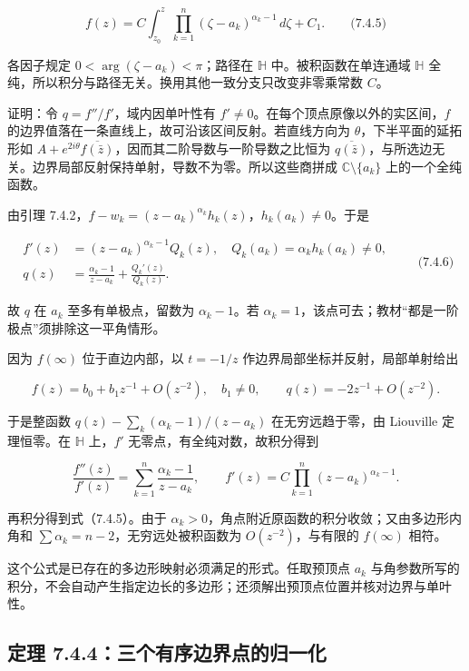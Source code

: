 \documentclass[11pt,a4paper]{article}
\begin{document}
\[
f(z)=C\int_{z_0}^z\prod_{k=1}^n(\zeta-a_k)^{\alpha_k-1}\,d\zeta+C_1.
\qquad\text{(7.4.5)}
\]

各因子规定 \(0<\arg(\zeta-a_k)<\pi\)；路径在 \(\mathbb H\)
中。被积函数在单连通域 \(\mathbb H\)
全纯，所以积分与路径无关。换用其他一致分支只改变非零乘常数 \(C\)。

证明：令 \(q=f''/f'\)，域内因单叶性有
\(f'\ne0\)。在每个顶点原像以外的实区间，\(f\)
的边界值落在一条直线上，故可沿该区间反射。若直线方向为
\(\theta\)，下半平面的延拓形如
\(A+e^{2i\theta}\overline{f(\bar z)}\)，因而其二阶导数与一阶导数之比恒为
\(\overline{q(\bar z)}\)，与所选边无关。边界局部反射保持单射，导数不为零。所以这些商拼成
\(\mathbb C\setminus\{a_k\}\) 上的一个全纯函数。

由引理 7.4.2，\(f-w_k=(z-a_k)^{\alpha_k}h_k(z)\)，\(h_k(a_k)\ne0\)。于是

\[
\begin{aligned}
f'(z)&=(z-a_k)^{\alpha_k-1}Q_k(z),\quad Q_k(a_k)=\alpha_kh_k(a_k)\ne0,\\
q(z)&=\frac{\alpha_k-1}{z-a_k}+\frac{Q_k'(z)}{Q_k(z)}.
\end{aligned}\qquad\text{(7.4.6)}
\]

故 \(q\) 在 \(a_k\) 至多有单极点，留数为 \(\alpha_k-1\)。若
\(\alpha_k=1\)，该点可去；教材``都是一阶极点''须排除这一平角情形。

因为 \(f(\infty)\) 位于直边内部，以 \(t=-1/z\)
作边界局部坐标并反射，局部单射给出

\[
f(z)=b_0+b_1z^{-1}+O(z^{-2}),\quad b_1\ne0,
\qquad q(z)=-2z^{-1}+O(z^{-2}).
\]

于是整函数 \(q(z)-\sum_k(\alpha_k-1)/(z-a_k)\) 在无穷远趋于零，由
Liouville 定理恒零。在 \(\mathbb H\) 上，\(f'\)
无零点，有全纯对数，故积分得到

\[
\frac{f''(z)}{f'(z)}=\sum_{k=1}^n\frac{\alpha_k-1}{z-a_k},\qquad
f'(z)=C\prod_{k=1}^n(z-a_k)^{\alpha_k-1}.
\]

再积分得到式（7.4.5）。由于
\(\alpha_k>0\)，角点附近原函数的积分收敛；又由多边形内角和
\(\sum\alpha_k=n-2\)，无穷远处被积函数为 \(O(z^{-2})\)，与有限的
\(f(\infty)\) 相符。

这个公式是已存在的多边形映射必须满足的形式。任取预顶点 \(a_k\)
与角参数所写的积分，不会自动产生指定边长的多边形；还须解出预顶点位置并核对边界与单叶性。

\subsection{定理 7.4.4：三个有序边界点的归一化}\label{ch07-s4-heading-5}
\end{document}
